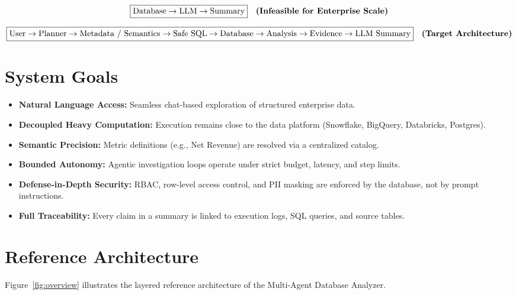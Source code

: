 \documentclass[11pt,a4paper]{article}
\begin{document}
\[
\boxed{\text{Database} \rightarrow \text{LLM} \rightarrow \text{Summary}} \quad \text{\textbf{(Infeasible for Enterprise Scale)}}
\]

\[
\boxed{
\text{User}
\rightarrow
\text{Planner}
\rightarrow
\text{Metadata / Semantics}
\rightarrow
\text{Safe SQL}
\rightarrow
\text{Database}
\rightarrow
\text{Analysis}
\rightarrow
\text{Evidence}
\rightarrow
\text{LLM Summary}
} \quad \text{\textbf{(Target Architecture)}}
\]

\section{System Goals}

\begin{itemize}[leftmargin=*]
    \item \textbf{Natural Language Access:} Seamless chat-based exploration of structured enterprise data.
    \item \textbf{Decoupled Heavy Computation:} Execution remains close to the data platform (Snowflake, BigQuery, Databricks, Postgres).
    \item \textbf{Semantic Precision:} Metric definitions (e.g., Net Revenue) are resolved via a centralized catalog.
    \item \textbf{Bounded Autonomy:} Agentic investigation loops operate under strict budget, latency, and step limits.
    \item \textbf{Defense-in-Depth Security:} RBAC, row-level access control, and PII masking are enforced by the database, not by prompt instructions.
    \item \textbf{Full Traceability:} Every claim in a summary is linked to execution logs, SQL queries, and source tables.
\end{itemize}

\section{Reference Architecture}

Figure~\ref{fig:overview} illustrates the layered reference architecture of the Multi-Agent Database Analyzer.
\end{document}
